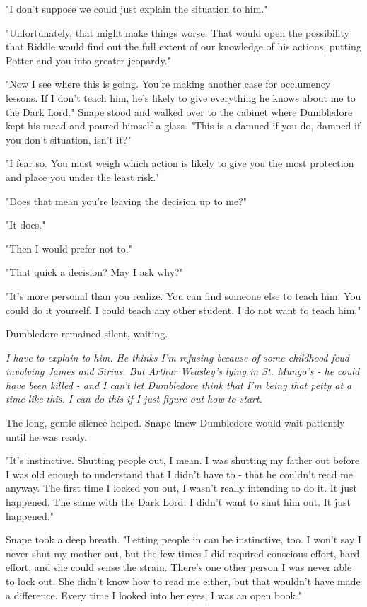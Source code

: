 \documentclass[a4paper,11pt]{article}
\begin{document}
"I don't suppose we could just explain the situation to him."

"Unfortunately, that might make things worse. That would open the possibility that Riddle would find out the full extent of our knowledge of his actions, putting Potter and you into greater jeopardy."

"Now I see where this is going. You're making another case for occlumency lessons. If I don't teach him, he's likely to give everything he knows about me to the Dark Lord." Snape stood and walked over to the cabinet where Dumbledore kept his mead and poured himself a glass. "This is a damned if you do, damned if you don't situation, isn't it?"

"I fear so. You must weigh which action is likely to give you the most protection and place you under the least risk."

"Does that mean you're leaving the decision up to me?"

"It does."

"Then I would prefer not to."

"That quick a decision? May I ask why?"

"It's more personal than you realize. You can find someone else to teach him. You could do it yourself. I could teach any other student. I do not want to teach him."

Dumbledore remained silent, waiting.

\emph{I have to explain to him. He thinks I'm refusing because of some childhood feud involving James and Sirius. But Arthur Weasley's lying in St. Mungo's - he could have been killed - and I can't let Dumbledore think that I'm being that petty at a time like this. I can do this if I just figure out how to start.}

The long, gentle silence helped. Snape knew Dumbledore would wait patiently until he was ready.

"It's instinctive. Shutting people out, I mean. I was shutting my father out before I was old enough to understand that I didn't have to - that he couldn't read me anyway. The first time I locked you out, I wasn't really intending to do it. It just happened. The same with the Dark Lord. I didn't want to shut him out. It just happened."

Snape took a deep breath. "Letting people in can be instinctive, too. I won't say I never shut my mother out, but the few times I did required conscious effort, hard effort, and she could sense the strain. There's one other person I was never able to lock out. She didn't know how to read me either, but that wouldn't have made a difference. Every time I looked into her eyes, I was an open book."
\end{document}
